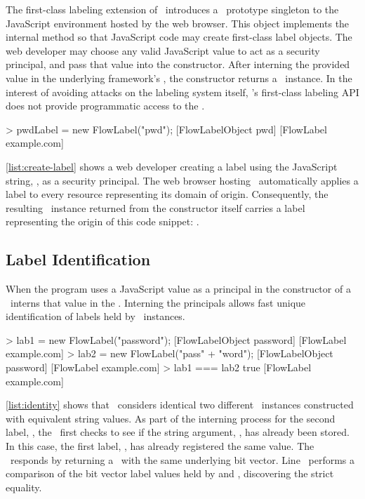 The first-class labeling extension of \JitFlow\ introduces a \FlowLabel\ prototype singleton to the JavaScript environment hosted by the web browser.
This object implements the internal  method so that JavaScript code may create first-class label objects.
The web developer may choose any valid JavaScript value to act as a security principal, and pass that value into the constructor.
After interning the provided value in the underlying framework's \FlowLabelRegistry, the constructor returns a \FlowLabelObject\ instance.
In the interest of avoiding attacks on the labeling system itself, \JitFlow's first-class labeling API does not provide programmatic access to the \FlowLabelRegistry.


\begin{jscode}
> pwdLabel = new FlowLabel("pwd");
  [FlowLabelObject pwd] [FlowLabel example.com]
\end{jscode}

\autoref{list:create-label} shows a web developer creating a label using the JavaScript string, , as a security principal.
The web browser hosting \JitFlow\ automatically applies a label to every resource representing its domain of origin.
Consequently, the resulting \FlowLabelObject\ instance returned from the constructor itself carries a label representing the origin of this code snippet: .

\subsection{Label Identification}

When the program uses a JavaScript value as a principal in the constructor of a \FlowLabelObject\, \JitFlow\ interns that value in the \FlowLabelRegistry.
Interning the principals allows fast unique identification of labels held by \FlowLabelObject\ instances.

\begin{jscode}
> lab1 = new FlowLabel("password");
  [FlowLabelObject password] [FlowLabel example.com]
> lab2 = new FlowLabel("pass" + "word");
  [FlowLabelObject password] [FlowLabel example.com]
> lab1 === lab2
  true [FlowLabel example.com]
\end{jscode}


\autoref{list:identity} shows that \JitFlow\ considers identical two different \FlowLabelObject\ instances constructed with equivalent string values.
As part of the interning process for the second label, , the \FlowLabelRegistry\ first checks to see if the string argument, , has already been stored.
In this case, the first label, , has already registered the same value.
The \FlowLabelRegistry\ responds by returning a \FlowLabelObject\ with the same underlying bit vector.
Line~ performs a comparison of the bit vector label values held by  and , discovering the strict equality.

